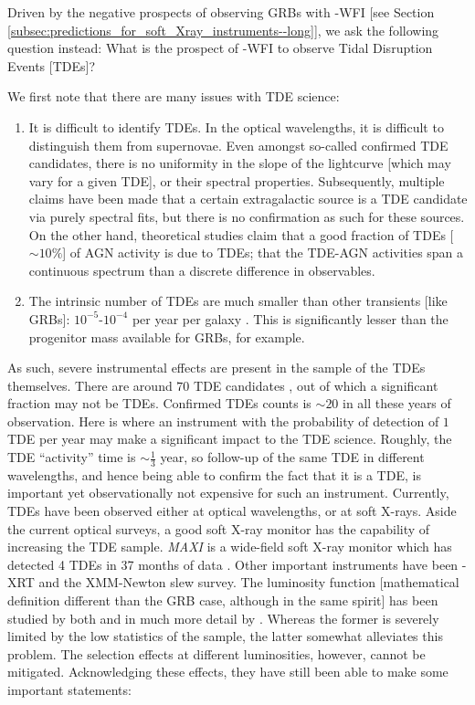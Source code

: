 Driven by the negative prospects of observing GRBs with \A -WFI [see Section \ref{subsec:predictions_for_soft_Xray_instruments--long}], we ask the following question instead: What is the prospect of \A -WFI to observe Tidal Disruption Events [TDEs]?

We first note that there are many issues with TDE science:
\begin{enumerate}
\item It is difficult to identify TDEs. In the optical wavelengths, it is difficult to distinguish them from supernovae. Even amongst so-called confirmed TDE candidates, there is no uniformity in the slope of the lightcurve [which may vary for a given TDE], or their spectral properties. Subsequently, multiple claims have been made that a certain extragalactic source is a TDE candidate via purely spectral fits, but there is no confirmation as such for these sources. On the other hand, theoretical studies claim that a good fraction of TDEs [$\sim 10 \%$] of AGN activity is due to TDEs; that the TDE-AGN activities span a continuous spectrum than a discrete difference in observables.

\item The intrinsic number of TDEs are much smaller than other transients [like GRBs]: $10^{-5}$-$10^{-4}$ per year per galaxy \citep{Auchettl_et_al.-2018-ApJ}. This is significantly lesser than the progenitor mass available for GRBs, for example.
\end{enumerate}

As such, severe instrumental effects are present in the sample of the TDEs themselves. There are around $70$ TDE candidates \citep{Auchettl_et_al.-2017-ApJ}, out of which a significant fraction may not be TDEs. Confirmed TDEs counts is $\sim 20$ in all these years of observation. Here is where an instrument with the probability of detection of $1$ TDE per year may make a significant impact to the TDE science. Roughly, the TDE ``activity'' time is $\sim \frac{1}{3}$ year, so follow-up of the same TDE in different wavelengths, and hence being able to confirm the fact that it is a TDE, is important yet observationally not expensive for such an instrument. Currently, TDEs have been observed either at optical wavelengths, or at soft X-rays. Aside the current optical surveys, a good soft X-ray monitor has the capability of increasing the TDE sample. \emph{MAXI} is a wide-field soft X-ray monitor which has detected 4 TDEs in 37 months of data \citep{Kawamuro_et_al.-2016-PASJ}. Other important instruments have been \s -XRT and the XMM-Newton slew survey. The luminosity function [mathematical definition different than the GRB case, although in the same spirit] has been studied by both \cite{Kawamuro_et_al.-2016-PASJ} and in much more detail by \cite{Auchettl_et_al.-2018-ApJ}. Whereas the former is severely limited by the low statistics of the sample, the latter somewhat alleviates this problem. The selection effects at different luminosities, however, cannot be mitigated. Acknowledging these effects, they have still been able to make some important statements:

